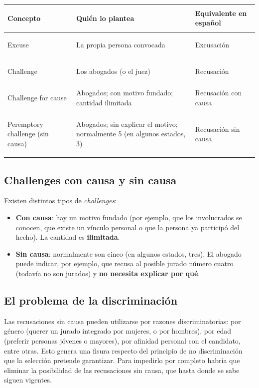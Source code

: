 \documentclass[12pt,oneside]{book}
\begin{document}
\begin{table}[H]
\centering
\small
\renewcommand{\arraystretch}{1.25}
\begin{tabularx}{\textwidth}{@{}>{\bfseries\raggedright\arraybackslash}p{}YY@{}}
\toprule
Concepto & Quién lo plantea & Equivalente en español \\
\midrule
Excuse & La propia persona convocada & Excusación \\
Challenge & Los abogados (o el juez) & Recusación \\
Challenge for cause & Abogados; con motivo fundado; cantidad ilimitada & Recusación con causa \\
Peremptory challenge (sin causa) & Abogados; sin explicar el motivo; normalmente 5 (en algunos estados, 3) & Recusación sin causa \\
\bottomrule
\end{tabularx}
\end{table}

\subsection{Challenges con causa y sin causa}

Existen distintos tipos de \textit{challenges}:
\begin{itemize}
\item \textbf{Con causa}: hay un motivo fundado (por ejemplo, que los involucrados se conocen, que existe un vínculo personal o que la persona ya participó del hecho). La cantidad es \textbf{ilimitada}.
\item \textbf{Sin causa}: normalmente son cinco (en algunos estados, tres). El abogado puede indicar, por ejemplo, que recusa al posible jurado número cuatro (todavía no son jurados) y \textbf{no necesita explicar por qué}.
\end{itemize}

\subsection{El problema de la discriminación}

Las recusaciones sin causa pueden utilizarse por razones discriminatorias: por género (querer un jurado integrado por mujeres, o por hombres), por edad (preferir personas jóvenes o mayores), por afinidad personal con el candidato, entre otras. Esto genera una fisura respecto del principio de no discriminación que la selección pretende garantizar. Para impedirlo por completo habría que eliminar la posibilidad de las recusaciones sin causa, que hasta donde se sabe siguen vigentes.
\end{document}

